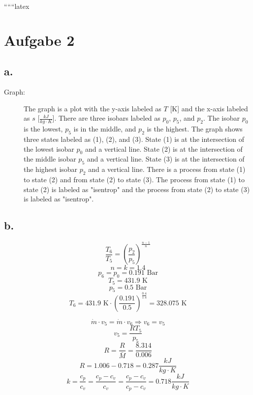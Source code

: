 
``````latex


\section*{Aufgabe 2}

\subsection*{a.}
\begin{description}
    \item[Graph:] The graph is a plot with the y-axis labeled as $T$ [K] and the x-axis labeled as $s$ [$\frac{kJ}{kg \cdot K}$]. There are three isobars labeled as $p_0$, $p_5$, and $p_2$. The isobar $p_0$ is the lowest, $p_5$ is in the middle, and $p_2$ is the highest. The graph shows three states labeled as (1), (2), and (3). State (1) is at the intersection of the lowest isobar $p_0$ and a vertical line. State (2) is at the intersection of the middle isobar $p_5$ and a vertical line. State (3) is at the intersection of the highest isobar $p_2$ and a vertical line. There is a process from state (1) to state (2) and from state (2) to state (3). The process from state (1) to state (2) is labeled as "isentrop" and the process from state (2) to state (3) is labeled as "isentrop".
\end{description}

\subsection*{b.}
\[
\frac{T_6}{T_5} = \left( \frac{p_2}{p_5} \right)^{\frac{n-1}{n}}
\]
\[
n = k = 1.4
\]
\[
p_6 = p_0 = 0.191 \text{ Bar}
\]
\[
T_5 = 431.9 \text{ K}
\]
\[
p_5 = 0.5 \text{ Bar}
\]
\[
T_6 = 431.9 \text{ K} \cdot \left( \frac{0.191}{0.5} \right)^{\frac{0.4}{1.4}} = 328.075 \text{ K}
\]

\[
\dot{m} \cdot v_5 = \dot{m} \cdot v_6 \Rightarrow v_6 = v_5
\]
\[
v_5 = \frac{R T_5}{p_5}
\]
\[
R = \frac{R}{\bar{M}} = \frac{8.314}{0.006}
\]
\[
R = 1.006 - 0.718 = 0.287 \frac{kJ}{kg \cdot K}
\]
\[
k = \frac{c_p}{c_v} = \frac{c_p - c_v}{c_v} = \frac{c_p - c_v}{c_p - c_v} = 0.718 \frac{kJ}{kg \cdot K}
\]

